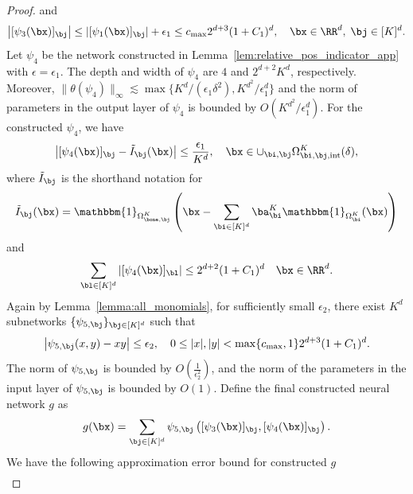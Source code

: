 \documentclass[11pt]{article}
\begin{document}
\begin{proof}
    and 
    \begin{equation*}
        \left|[\psi_3(\bx)]_{\bj}  \right| \leq |[\psi_1(\bx)]_{\bj}| + \epsilon_1 \leq c_{\max} 2^{d+3} (1+C_1)^d, \quad \bx \in \RR^d, \; \bj \in [K]^d.
    \end{equation*}
    Let $\psi_4$ be the network constructed in Lemma~\ref{lem:relative_pos_indicator_app} with $\epsilon = \epsilon_1$. The depth and width of $\psi_4$ are $4$ and $2^{d+2} K^d$, respectively. Moreover, $\|\theta(\psi_4)\|_{\infty} \lesssim \max \{K^{d} / (\epsilon_1 \delta^2), K^{d^2} / \epsilon_1^d\}$ and the norm of parameters in the output layer of $\psi_4$ is bounded by $O(K^{d^2} / \epsilon_1^d)$.
    For the constructed $\psi_4$, we have 
    \begin{equation*}
        \left| [\psi_4(\bx)]_{\bj} - \tilde{I}_{\bj}(\bx) \right| \leq \frac{\epsilon_1}{K^d}, \quad \bx \in \cup_{\bi, \bj} \Omega_{\bi, \bj, \mathrm{int}}^{K}(\delta),
    \end{equation*}
    where $\tilde{I}_{\bj}$ is the shorthand notation for 
    \begin{equation*}
        \tilde{I}_{\bj}(\bx) = \mathbbm{1}_{\Omega_{\bone, \bj}^{K}}  \left(\bx - \sum_{\bi \in [K]^d} \ba_{\bi}^K  \mathbbm{1}_{\Omega_{\bi}^K}(\bx)\right)
    \end{equation*}
    and 
    \begin{equation*}
        \sum_{\bl \in [K]^d} |[\psi_4(\bx)]_{\bl}| \leq 2^{d+2}(1 +C_1)^d \quad \bx \in \RR^d.
    \end{equation*}
    Again by Lemma~\ref{lemma:all_monomials}, for sufficiently small $\epsilon_2$, there exist $K^d$ subnetworks $\{\psi_{5,\bj}\}_{\bj\in[K]^{d}}$ such that
    \begin{equation*}
        \left| \psi_{5, \bj}(x,y) - xy\right| \leq \epsilon_2, \quad 0\leq |x|, |y| < \max \{c_{\max},1\} 2^{d+3}(1+C_1)^d.
    \end{equation*}
    The norm of $\psi_{5,\bj}$ is bounded by $O\left( \frac{1}{\epsilon_2^2} \right)$, and the norm of the parameters in the input layer of $\psi_{5,\bj}$ is bounded by $O(1)$. Define the final constructed neural network $g$ as 
    \begin{equation*}
        g(\bx) = \sum_{\bj \in [K]^d} \psi_{5, \bj} \left([\psi_3(\bx)]_{\bj}, [\psi_4(\bx)]_{\bj}\right).
    \end{equation*}
    We have the following approximation error bound for constructed $g$
    \begin{equation*}
        \begin{aligned}

\end{aligned}
\end{equation*}
\end{proof}
\end{document}
